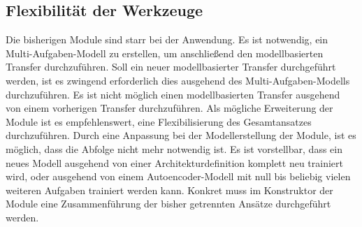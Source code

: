 	\subsection{Flexibilität der Werkzeuge}
	\label{subsec:FlexibilitätDerWerkzeuge}
	Die bisherigen Module sind starr bei der Anwendung. Es ist notwendig, ein Multi-Aufgaben-Modell zu erstellen, um anschließend den modellbasierten Transfer durchzuführen. Soll ein neuer modellbasierter Transfer durchgeführt werden, ist es zwingend erforderlich dies ausgehend des Multi-Aufgaben-Modells durchzuführen. Es ist nicht möglich einen modellbasierten Transfer ausgehend von einem vorherigen Transfer durchzuführen. 
	Als mögliche Erweiterung der Module ist es empfehlenswert, eine Flexibilisierung des Gesamtansatzes durchzuführen. Durch eine Anpassung bei der Modellerstellung der Module, ist es möglich, dass die Abfolge nicht mehr notwendig ist. Es ist vorstellbar, dass ein neues Modell ausgehend von einer Architekturdefinition komplett neu trainiert wird, oder ausgehend von einem Autoencoder-Modell mit null bis beliebig vielen weiteren Aufgaben trainiert werden kann. Konkret muss im Konstruktor der Module eine Zusammenführung der bisher getrennten Ansätze durchgeführt werden.     

